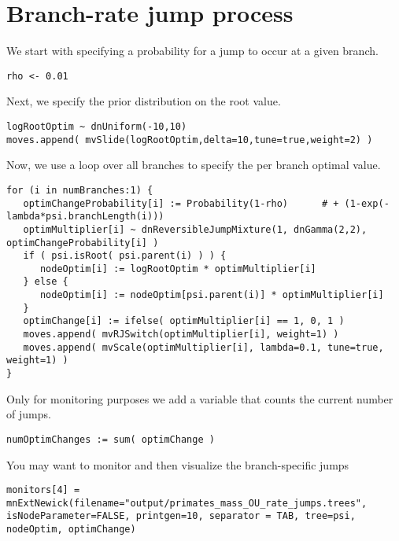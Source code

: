 \vspace{5cm}



\section{Branch-rate jump process}


We start with specifying a probability for a jump to occur at a given branch.
{\tt \small \begin{snugshade*}
\begin{lstlisting}
rho <- 0.01
\end{lstlisting}
\end{snugshade*}}

Next, we specify the prior distribution on the root value.
{\tt \small \begin{snugshade*}
\begin{lstlisting}
logRootOptim ~ dnUniform(-10,10)
moves.append( mvSlide(logRootOptim,delta=10,tune=true,weight=2) )
\end{lstlisting}
\end{snugshade*}}

Now, we use a loop over all branches to specify the per branch optimal value.
{\tt \small \begin{snugshade*}
\begin{lstlisting}
for (i in numBranches:1) {
   optimChangeProbability[i] := Probability(1-rho)      # + (1-exp(-lambda*psi.branchLength(i)))
   optimMultiplier[i] ~ dnReversibleJumpMixture(1, dnGamma(2,2), optimChangeProbability[i] )
   if ( psi.isRoot( psi.parent(i) ) ) {
      nodeOptim[i] := logRootOptim * optimMultiplier[i]
   } else {
      nodeOptim[i] := nodeOptim[psi.parent(i)] * optimMultiplier[i]
   }
   optimChange[i] := ifelse( optimMultiplier[i] == 1, 0, 1 )
   moves.append( mvRJSwitch(optimMultiplier[i], weight=1) )
   moves.append( mvScale(optimMultiplier[i], lambda=0.1, tune=true, weight=1) )
}
\end{lstlisting}
\end{snugshade*}}
Only for monitoring purposes we add a variable that counts the current number of jumps.
{\tt \small \begin{snugshade*}
\begin{lstlisting}
numOptimChanges := sum( optimChange )
\end{lstlisting}
\end{snugshade*}}
You may want to monitor and then visualize the branch-specific jumps
{\tt \small \begin{snugshade*}
\begin{lstlisting}
monitors[4] = mnExtNewick(filename="output/primates_mass_OU_rate_jumps.trees", isNodeParameter=FALSE, printgen=10, separator = TAB, tree=psi, nodeOptim, optimChange)
\end{lstlisting}
\end{snugshade*}}






